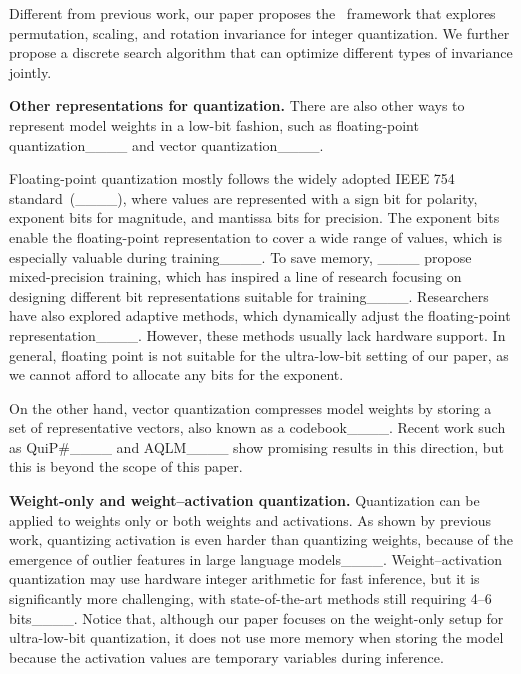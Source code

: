 Different from previous work, our paper proposes the  \method\ framework that explores permutation, scaling, and rotation invariance for integer quantization. We further propose a discrete search algorithm that can optimize different types of invariance jointly. 

\textbf{Other representations for quantization.} There are also other ways to represent model weights in a low-bit fashion, such as floating-point quantization____ and vector quantization____.

Floating-point quantization mostly follows the widely adopted IEEE 754 standard~(____), where values are represented with a sign bit for polarity, exponent bits for magnitude, and mantissa bits for precision.
The exponent bits enable the floating-point representation to cover a wide range of values, which is especially valuable during training____.
To save memory, ____ propose mixed-precision training, which has inspired a line of research focusing on designing different bit representations suitable for training____.
Researchers have also explored adaptive methods, which dynamically adjust the floating-point representation____. However, these methods usually lack hardware support.
In general, floating point is not suitable for the ultra-low-bit setting of our paper, as we cannot afford to allocate any bits for the exponent.

On the other hand, vector quantization compresses model weights by storing a set of representative vectors, also known as a codebook____.
Recent work such as QuiP\#____ and AQLM____ show promising results in this direction, but this is beyond the scope of this paper.

\textbf{Weight-only and weight--activation quantization.}
Quantization can be applied to weights only or both weights and activations.
As shown by previous work, quantizing activation is even harder than quantizing weights, because of the emergence of outlier features in large language models____. Weight--activation quantization may use hardware integer arithmetic for fast inference, but it is significantly more challenging, with state-of-the-art methods still requiring 4--6 bits____. Notice that, although our paper focuses on the weight-only setup for ultra-low-bit quantization, it does not use more memory when storing the model because the activation values are temporary variables during inference.